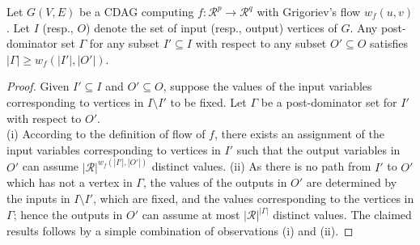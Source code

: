 \documentclass[a4paper,UKenglish]{lipics-v2016}
\newcommand{\ri}{\mathcal{R}}
\begin{document}
\begin{lemma}\label{lem:flowpost}
Let $G(V,E)$ be a CDAG computing $f:\mathcal{\ri}^p\rightarrow\mathcal{\ri}^q$ with Grigoriev's flow
$w_f(u,v)$. Let $I$ (resp., $O$) denote the set of input (resp.,
output) vertices of $G$. Any post-dominator set $\Gamma$ for any
subset $I'\subseteq I$ with respect to any subset $O'\subseteq O$
satisfies $|\Gamma| \geq w_f(|I'|,|O'|)$.
\end{lemma}
\begin{proof}
Given $I'\subseteq I$ and $O'\subseteq O$, suppose the values of the
input variables corresponding to vertices in $I \setminus I'$ to be
fixed. Let $\Gamma$ be a post-dominator set for $I'$ with respect to
$O'$.\\ (i) According to the definition of flow of $f$, there exists an
assignment of the input variables corresponding to vertices in $I'$
such that the output variables in $O'$ can assume
$|\ri|^{w_{f}\left(|I'|,|O'|\right)}$ distinct values. (ii) As
there is no path from $I'$ to $O'$ which has not a vertex in $\Gamma$,
the values of the outputs in $O'$ are determined by the inputs in
$I\setminus I'$, which are fixed, and the values corresponding to the
vertices in $\Gamma$; hence the outputs in $O'$ can assume at most
$|\ri|^{|\Gamma|}$ distinct values. The claimed results follows
by a simple combination of observations (i) and (ii).
\end{proof}
\end{document}
